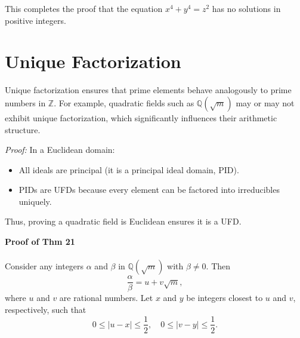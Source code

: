 \documentclass{article}
\begin{document}
This completes the proof that the equation \( x^4 + y^4 = z^2 \) has no solutions in positive integers.

\section{Unique Factorization }

Unique factorization ensures that prime elements behave analogously to prime numbers in \( \mathbb{Z} \). For example, quadratic fields such as \( \mathbb{Q}(\sqrt{m}) \) may or may not exhibit unique factorization, which significantly influences their arithmetic structure.




\textit{Proof:} In a Euclidean domain:
\begin{itemize}
    \item All ideals are principal (it is a principal ideal domain, PID).
    \item PIDs are UFDs because every element can be factored into irreducibles uniquely.
\end{itemize}
Thus, proving a quadratic field is Euclidean ensures it is a UFD.

\noindent
\textbf{Proof of Thm 21} \\\\
Consider any integers \( \alpha \) and \( \beta \) in \( \mathbb{Q}(\sqrt{m}) \) with \( \beta \neq 0 \). Then 
\[
\frac{\alpha}{\beta} = u + v\sqrt{m},
\]
where \( u \) and \( v \) are rational numbers. Let \( x \) and \( y \) be integers closest to \( u \) and \( v \), respectively, such that
\[
0 \leq |u - x| \leq \frac{1}{2}, \quad 0 \leq |v - y| \leq \frac{1}{2}. 
\]
\end{document}
